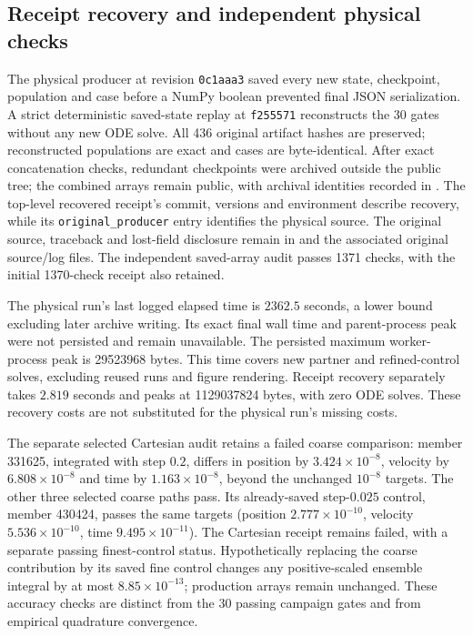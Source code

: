 \documentclass[11pt,letterpaper]{article}
\begin{document}
\subsection*{Receipt recovery and independent physical checks}
The physical producer at revision \texttt{0c1aaa3} saved every new state,
checkpoint, population and case before a NumPy boolean prevented final
JSON serialization. A strict deterministic saved-state replay at
\texttt{f255571} reconstructs the 30 gates without any new ODE solve.
All 436 original artifact hashes are preserved; reconstructed populations
are exact and cases are byte-identical. After exact concatenation checks,
redundant checkpoints were archived outside the public tree; the combined
arrays remain public, with archival identities recorded in
. The top-level recovered receipt's
commit, versions and environment describe recovery, while its
\texttt{original\_producer} entry identifies the physical source. The
original source, traceback and lost-field disclosure remain in
 and the
associated original source/log files. The independent saved-array audit
passes 1371 checks, with the initial 1370-check receipt also retained.

The physical run's last logged elapsed time is $2362.5$ seconds, a lower
bound excluding later archive writing. Its exact final wall time and
parent-process peak were not persisted and remain unavailable. The
persisted maximum worker-process peak is 29523968 bytes. This time covers
new partner and refined-control solves, excluding reused runs and figure
rendering. Receipt recovery separately takes $2.819$ seconds and peaks at
1129037824 bytes, with zero ODE solves. These recovery costs are not
substituted for the physical run's missing costs.

The separate selected Cartesian audit retains a failed coarse comparison:
member 331625, integrated with step $0.2$, differs in position by
$3.424\times10^{-8}$, velocity by $6.808\times10^{-8}$ and time by
$1.163\times10^{-8}$, beyond the unchanged $10^{-8}$ targets. The other
three selected coarse paths pass. Its already-saved step-$0.025$ control,
member 430424, passes the same targets (position $2.777\times10^{-10}$,
velocity $5.536\times10^{-10}$, time $9.495\times10^{-11}$).
The Cartesian receipt remains failed, with a separate passing finest-control
status. Hypothetically replacing the coarse contribution by its saved fine
control changes any positive-scaled ensemble integral by at most
$8.85\times10^{-13}$; production arrays remain unchanged. These accuracy
checks are distinct from the 30 passing campaign gates and from empirical
quadrature convergence.
\end{document}
